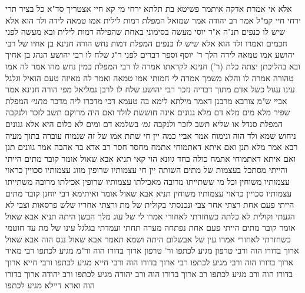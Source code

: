 \documentclass[12pt, openany]{book}
\begin{document}
{אלא אי אמרת אדקה איתמר פשיטא  בת תלתא ירחי מי קא חיי 
אצטריך סד"א  כל בציר תרי ירחי חיי קמ"ל 
אמר רב יהודה אמר שמואל   המפלת דמות לילית אמו טמאה לידה  ולד הוא אלא שיש לו כנפים  תנ"ה א"ר יוסי  מעשה בסימוני באחת שהפילה דמות לילית ובא מעשה לפני חכמים ואמרו ולד הוא אלא שיש לו כנפים 
המפלת דמות נחש הורה חנינא בן אחיו של רבי יהושע  אמו טמאה לידה  הלך ר' יוסף וספר דברים לפני ר"ג שלח לו  רבי יהושע הנהג בן אחיך ובא 
בהליכתן יצתה כלת (ר') חנינא לקראתו אמרה לו  רבי המפלת כמין נחש מהו  אמר לה  אמו טהורה  אמרה לו  והלא משמך אמרה לי חמותי אמו טמאה  ואמר לה מאיזה טעם הואיל וגלגל עינו עגול כשל אדם  מתוך דבריה נזכר רבי יהושע שלח לו לרבן גמליאל  מפי הורה חנינא 
אמר אביי  ש"מ צורבא מרבנן דאמר מילתא לימא בה טעמא דכי מדכרו ליה מדכר
{\large\emph{מתני׳}} המפלת שפיר מלא מים מלא דם מלא גנונים אינה חוששת לולד ואם היה מרוקם תשב לזכר ולנקבה המפלת סנדל או שליא תשב לזכר ולנקבה
{\large\emph{גמ׳}} בשלמא דם ומים לא כלום היא אלא גנונים ניחוש שמא ולד הוה ונימוח אמר אביי  כמה יין חי שתת אמו של זה שנמוח עוברה בתוך מעיה 
רבא אמר  מלא תנן ואם איתא דאתמוחי אתמח מחסר חסר  רב אדא בר אהבה אמר  גוונים תנן ואם איתא דאתמוחי אתמח כולה בחד גוונא הוי קאי 
תניא אבא שאול אומר  קובר מתים הייתי והייתי מסתכל בעצמות של מתים  השותה יין חי עצמותיו שרופין מזוג עצמותיו סכויין כראוי עצמותיו משוחין  וכל מי ששתייתו מרובה מאכילתו עצמותיו שרופין אכילתו מרובה משתייתו עצמותיו סכויין כראוי עצמותיו משוחין 
תניא אבא שאול אומר ואיתימא רבי יוחנן  קובר מתים הייתי פעם אחת רצתי אחר צבי ונכנסתי בקולית של מת ורצתי אחריו שלש פרסאות וצבי לא הגעתי וקולית לא כלתה  כשחזרתי לאחורי אמרו לי  של עוג מלך הבשן היתה 
תניא אבא שאול אומר  קובר מתים הייתי פעם אחת נפתחה מערה תחתי ועמדתי בגלגל עינו של מת עד חוטמי  כשחזרתי לאחורי אמרו  עין של אבשלום היתה 
ושמא תאמר  אבא שאול ננס הוה אבא שאול ארוך בדורו הוה ורבי טרפון מגיע לכתפו ור' טרפון ארוך בדורו הוה ור"מ מגיע לכתפו רבי מאיר ארוך בדורו הוה ורבי מגיע לכתפו רבי ארוך בדורו הוה
ורבי חייא מגיע לכתפו ורבי חייא ארוך בדורו הוה ורב מגיע לכתפו רב ארוך בדורו הוה ורב יהודה מגיע לכתפו ורב יהודה ארוך בדורו הוה ואדא דיילא מגיע לכתפו}
\end{document}
